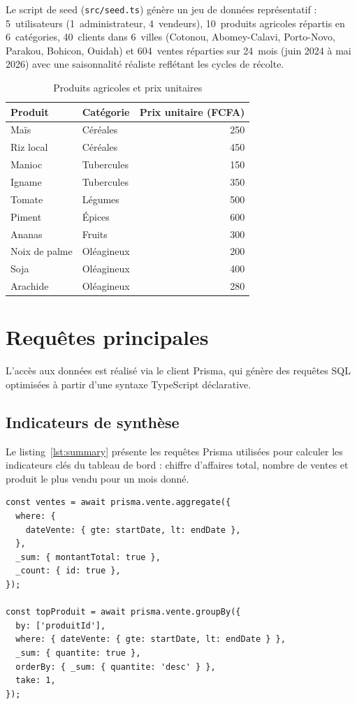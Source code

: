 \documentclass[11pt,a4paper]{report}
\begin{document}
Le script de seed (\texttt{src/seed.ts}) génère un jeu de données représentatif :
5~utilisateurs (1~administrateur, 4~vendeurs), 10~produits agricoles répartis en
6~catégories, 40~clients dans 6~villes (Cotonou, Abomey-Calavi, Porto-Novo,
Parakou, Bohicon, Ouidah) et 604~ventes réparties sur 24~mois (juin 2024 à mai
2026) avec une saisonnalité réaliste reflétant les cycles de récolte.

\begin{table}[H]
\centering
\caption{Produits agricoles et prix unitaires}
\label{tab:produits}
\renewcommand{\arraystretch}{1.25}
\begin{tabular}{@{}l l r@{}}
\toprule
\textbf{Produit} & \textbf{Catégorie} & \textbf{Prix unitaire (FCFA)}\\
\midrule
Maïs          & Céréales    & 250\\
Riz local     & Céréales    & 450\\
Manioc        & Tubercules  & 150\\
Igname        & Tubercules  & 350\\
Tomate        & Légumes     & 500\\
Piment        & Épices      & 600\\
Ananas        & Fruits      & 300\\
Noix de palme & Oléagineux  & 200\\
Soja          & Oléagineux  & 400\\
Arachide      & Oléagineux  & 280\\
\bottomrule
\end{tabular}
\end{table}

\section{Requêtes principales}
L'accès aux données est réalisé via le client Prisma, qui génère des requêtes SQL
optimisées à partir d'une syntaxe TypeScript déclarative.

\subsection{Indicateurs de synthèse}
Le listing~\ref{lst:summary} présente les requêtes Prisma utilisées pour calculer
les indicateurs clés du tableau de bord : chiffre d'affaires total, nombre de
ventes et produit le plus vendu pour un mois donné.

\begin{lstlisting}[caption={Requêtes Prisma pour les indicateurs de synthèse (route GET /api/stats/summary)},label={lst:summary}]
const ventes = await prisma.vente.aggregate({
  where: {
    dateVente: { gte: startDate, lt: endDate },
  },
  _sum: { montantTotal: true },
  _count: { id: true },
});

const topProduit = await prisma.vente.groupBy({
  by: ['produitId'],
  where: { dateVente: { gte: startDate, lt: endDate } },
  _sum: { quantite: true },
  orderBy: { _sum: { quantite: 'desc' } },
  take: 1,
});
\end{lstlisting}
\end{document}
